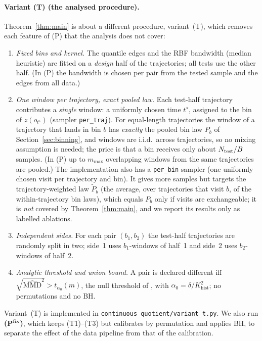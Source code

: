 \documentclass[10pt]{article}
\newcommand{\mmd}{\mathrm{MMD}}
\newcommand{\Khist}{K_{\mathrm{hist}}}
\begin{document}
\paragraph{Variant (T) (the analysed procedure).}
\label{sec:variantT-def}
Theorem~\ref{thm:main} is about a different procedure, variant~(T), which
removes each feature of (P) that the analysis does not cover:
\begin{enumerate}
\item[(T1)] \emph{Fixed bins and kernel.}  The quantile edges and the RBF
  bandwidth (median heuristic) are fitted on a \emph{design} half of the
  trajectories; all tests use the other half.  (In (P) the bandwidth is chosen
  per pair from the tested sample and the edges from all data.)
\item[(T2)] \emph{One window per trajectory, exact pooled law.}  Each
  test-half trajectory contributes a \emph{single} window: a uniformly chosen
  time $t^\star$, assigned to the bin of $z(o_{t^\star})$ (sampler
  \texttt{per\_traj}).  For equal-length trajectories the window of a
  trajectory that lands in bin $b$ has \emph{exactly} the pooled bin law $P_b$
  of Section~\ref{sec:binning}, and windows are i.i.d.\ across trajectories, so
  no mixing assumption is needed; the price is that a bin receives only about
  $N_{\rm test}/B$ samples.  (In (P) up to $m_{\max}$ overlapping windows from
  the same trajectories are pooled.)  The implementation also has a
  \texttt{per\_bin} sampler (one uniformly chosen visit per trajectory and bin).
  It gives more samples but targets the trajectory-weighted law
  $\tilde P_b$ (the average, over trajectories that visit $b$, of the
  within-trajectory bin laws), which equals $P_b$ only if visits are
  exchangeable; it is \emph{not} covered by
  Theorem~\ref{thm:main}, and we report its results only as labelled
  ablations.
\item[(T3)] \emph{Independent sides.}  For each pair $(b_1,b_2)$ the test-half
  trajectories are randomly split in two; side~1 uses $b_1$-windows of half~1 and
  side~2 uses $b_2$-windows of half~2.
\item[(T4)] \emph{Analytic threshold and union bound.}  A pair is declared
  different iff $\sqrt{\widehat{\mmd}^2}>t_{\alpha_0}(m)$, the null threshold of
  \citet[Cor.~9]{Gretton2012}, with $\alpha_0=\delta/\Khist^2$; no permutations
  and no BH.
\end{enumerate}
Variant~(T) is implemented in \texttt{continuous\_quotient/variant\_t.py}.  We
also run \textbf{(P$^{\rm fix}$)}, which keeps (T1)--(T3) but calibrates by
permutation and applies BH, to separate the effect of the data pipeline from
that of the calibration.
\end{document}
